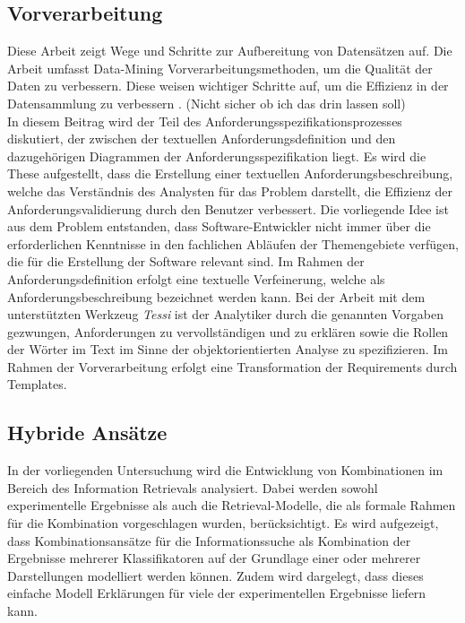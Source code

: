 \subsection{Vorverarbeitung}
Diese Arbeit zeigt Wege und Schritte zur Aufbereitung von Datensätzen auf. Die Arbeit umfasst Data-Mining Vorverarbeitungsmethoden, um die Qualität der Daten zu verbessern. Diese weisen wichtiger Schritte auf, um die Effizienz in der Datensammlung zu verbessern \cite{alasadi2017review}. (Nicht sicher ob ich das drin lassen soll)\\

In diesem Beitrag wird der Teil des Anforderungsspezifikationsprozesses diskutiert, der zwischen der textuellen Anforderungsdefinition und den dazugehörigen Diagrammen der Anforderungsspezifikation liegt. Es wird die These aufgestellt, dass die Erstellung einer textuellen Anforderungsbeschreibung, welche das Verständnis des Analysten für das Problem darstellt, die Effizienz der Anforderungsvalidierung durch den Benutzer verbessert. Die vorliegende Idee ist aus dem Problem entstanden, dass Software-Entwickler nicht immer über die erforderlichen Kenntnisse in den fachlichen Abläufen der Themengebiete verfügen, die für die Erstellung der Software relevant sind. Im Rahmen der Anforderungsdefinition erfolgt eine textuelle Verfeinerung, welche als Anforderungsbeschreibung bezeichnet werden kann. Bei der Arbeit mit dem unterstützten Werkzeug \emph{Tessi} ist der Analytiker durch die genannten Vorgaben gezwungen, Anforderungen zu vervollständigen und zu erklären sowie die Rollen der Wörter im Text im Sinne der objektorientierten Analyse zu spezifizieren. Im Rahmen der Vorverarbeitung erfolgt eine Transformation der Requirements durch Templates.\cite{kroha2000preprocessing}

\subsection{Hybride Ansätze}
In der vorliegenden Untersuchung wird die Entwicklung von Kombinationen im Bereich des Information Retrievals analysiert. Dabei werden sowohl experimentelle Ergebnisse als auch die Retrieval-Modelle, die als formale Rahmen für die Kombination vorgeschlagen wurden, berücksichtigt. Es wird aufgezeigt, dass Kombinationsansätze für die Informationssuche als Kombination der Ergebnisse mehrerer Klassifikatoren auf der Grundlage einer oder mehrerer Darstellungen modelliert werden können. Zudem wird dargelegt, dass dieses einfache Modell Erklärungen für viele der experimentellen Ergebnisse liefern kann.\cite{croft2000combining}\\

